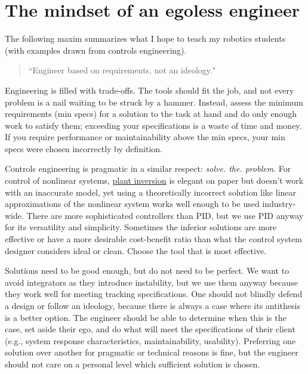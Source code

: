 \section{The mindset of an egoless engineer}
\label{sec:the_mindset_of_an_egoless_engineer}

The following maxim summarizes what I hope to teach my robotics students (with
examples drawn from controls engineering).

\begin{quote}
  ``Engineer based on requirements, not an ideology."
\end{quote}

Engineering is filled with trade-offs. The tools should fit the job, and not
every problem is a nail waiting to be struck by a hammer. Instead, assess the
minimum requirements (min specs) for a solution to the task at hand and do only
enough work to satisfy them; exceeding your specifications is a waste of time
and money. If you require performance or maintainability above the min specs,
your min specs were chosen incorrectly by definition.

Controls engineering is pragmatic in a similar respect:
\textit{solve. the. problem}. For control of nonlinear systems,
\href{https://faculty.washington.edu/devasia/Inversion.html}{plant inversion}
is elegant on paper but doesn't work with an inaccurate model, yet using a
theoretically incorrect solution like linear approximations of the nonlinear
system works well enough to be used industry-wide. There are more sophisticated
controllers than PID, but we use PID anyway for its versatility and simplicity.
Sometimes the inferior solutions are more effective or have a more desirable
cost-benefit ratio than what the control system designer considers ideal or
clean. Choose the tool that is most effective.

Solutions need to be good enough, but do not need to be perfect. We want to
avoid integrators as they introduce instability, but we use them anyway because
they work well for meeting tracking specifications. One should not blindly
defend a design or follow an ideology, because there is always a case where its
antithesis is a better option. The engineer should be able to determine when
this is the case, set aside their ego, and do what will meet the specifications
of their client (e.g., system response characteristics, maintainability,
usability). Preferring one solution over another for pragmatic or technical
reasons is fine, but the engineer should not care on a personal level which
sufficient solution is chosen.
